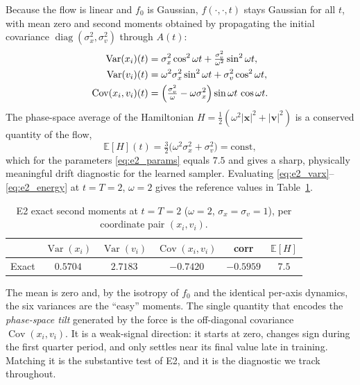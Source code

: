 \documentclass[11pt]{article}
\newcommand{\E}{\mathbb{E}}
\newcommand{\vx}{\mathbf{x}}
\newcommand{\vv}{\mathbf{v}}
\theoremstyle{plain}
\begin{document}
Because the flow is linear and $f_0$ is Gaussian, $f(\cdot,\cdot,t)$ stays Gaussian for all $t$, with mean zero and second moments obtained by propagating the initial covariance $\operatorname{diag}(\sigma_x^2,\sigma_v^2)$ through $A(t)$:
\begin{align}
\operatorname{Var}(x_i)(t) &= \sigma_x^2\cos^2\omega t + \tfrac{\sigma_v^2}{\omega^2}\sin^2\omega t,
\label{eq:e2_varx}\\
\operatorname{Var}(v_i)(t) &= \omega^2\sigma_x^2\sin^2\omega t + \sigma_v^2\cos^2\omega t,
\label{eq:e2_varv}\\
\operatorname{Cov}(x_i,v_i)(t) &= \Bigl(\tfrac{\sigma_v^2}{\omega}-\omega\sigma_x^2\Bigr)\sin\omega t\,\cos\omega t.
\label{eq:e2_cov}
\end{align}
The phase-space average of the Hamiltonian $H=\tfrac12(\omega^2|\vx|^2+|\vv|^2)$ is a conserved quantity of the flow,
\begin{equation}
\E[H](t)=\tfrac{3}{2}\bigl(\omega^2\sigma_x^2+\sigma_v^2\bigr)=\text{const},
\label{eq:e2_energy}
\end{equation}
which for the parameters \eqref{eq:e2_params} equals $7.5$ and gives a sharp, physically meaningful drift diagnostic for the learned sampler. Evaluating \eqref{eq:e2_varx}--\eqref{eq:e2_energy} at $t=T=2$, $\omega=2$ gives the reference values in Table~\ref{tab:e2_exact}.

\begin{table}[H]
\centering
\caption{E2 exact second moments at $t=T=2$ ($\omega=2$, $\sigma_x=\sigma_v=1$),
per coordinate pair $(x_i,v_i)$.}
\label{tab:e2_exact}
\begin{tabular}{lccccc}
\toprule
 & $\operatorname{Var}(x_i)$ & $\operatorname{Var}(v_i)$ & $\operatorname{Cov}(x_i,v_i)$ & corr & $\E[H]$\\
\midrule
Exact & $0.5704$ & $2.7183$ & $-0.7420$ & $-0.5959$ & $7.5$\\
\bottomrule
\end{tabular}
\end{table}

The mean is zero and, by the isotropy of $f_0$ and the identical per-axis dynamics, the six variances are the ``easy'' moments. The single quantity that encodes the \emph{phase-space tilt} generated by the force is the off-diagonal covariance $\operatorname{Cov}(x_i,v_i)$. It is a weak-signal direction: it starts at zero, changes sign during the first quarter period, and only settles near its final value late in training. Matching it is the substantive test of E2, and it is the diagnostic we track throughout.
\end{document}

